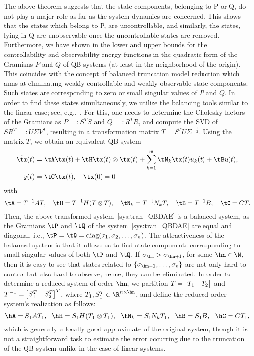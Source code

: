 The above theorem suggests that the state components, belonging to \ker P or \ker Q, do not play a major role as far as the system dynamics are concerned. This shows that the states which belong to \ker P,  are uncontrollable, and similarly, the states, lying in \ker Q are unobservable once the uncontrollable states are removed. Furthermore, we have shown in  the lower and upper bounds for the controllability and observability energy functions in the quadratic form of the Gramians $P$ and $Q$ of QB systems (at least in the neighborhood of the origin). This coincides with the concept of balanced truncation model reduction which aims at eliminating weakly controllable and weakly observable state components. Such states are corresponding to zero or small singular values of $P$ and $Q$. In order to find these states simultaneously, we utilize the balancing tools similar to the linear case; see, e.g.,~\cite{moral1994,morAnt05}. For this, one needs to determine the Cholesky factors of the Gramians as  $P =: S^TS$  and $Q =: R^TR$, and compute the SVD of $ SR^T =: U\Sigma V^T $, resulting in a transformation matrix $T = S^TU\Sigma^{-\tfrac{1}{2}}$. Using the matrix $T$, we obtain an equivalent QB system
\begin{equation}\label{sys:tran_QBDAE}
\begin{aligned}
\dot{\tx}(t) &= \tA \tx(t) + \tH \tx(t)\otimes \tx(t) + \sum_{k=1}^m\tN_k \tx(t)u_k(t) + \tB u(t),\\
y(t) &= \tC \tx(t),\quad \tx(0) = 0
\end{aligned}
\end{equation}
with $$\tA = T^{-1}AT,\quad\tH = T^{-1}H(T\otimes T),\quad\tN_k = T^{-1}N_kT,\quad\tB = T^{-1}B,\quad\tC = CT.$$
Then, the above transformed system~\eqref{sys:tran_QBDAE} is a balanced system, as the Gramians $\tP$ and $\tQ$ of the system~\eqref{sys:tran_QBDAE} are equal and diagonal, i.e., $\tP = \tQ = \mbox{diag}(\sigma_1,\sigma_2,\ldots,\sigma_n)$. The attractiveness of the balanced system is that it allows us to find  state components corresponding to small singular values of both $\tP$ and $\tQ$. If $\sigma_{\hn} > \sigma_{\hn+1}$, for some $\hn\in\N$, then it is easy to see that states related to $\{\sigma_{\hn+1},\ldots,\sigma_n\}$ are not only hard to control but also hard to observe; hence, they can be eliminated. In order to determine a reduced system of order $\hn$, we partition $T = \begin{bmatrix} T_1 &T_2\end{bmatrix}$ and $T^{-1} = \begin{bmatrix} S_1^T & S_2^T\end{bmatrix}^T$, where $T_1,S_1^T \in \R^{n\times \hn}$, and define the reduced-order system's realization as follows:
\begin{equation}\label{eq:red_realization}
\hA = S_1AT_1,~~\hH = S_1H(T_1\otimes T_1),~~\hN_k = S_1N_kT_1,~~\hB = S_1B,~~\hC = CT_1,
\end{equation}
which is generally a locally good approximate of the original system; though it is not a straightforward task to estimate the error occurring due to the truncation of the QB system unlike in the case of linear systems.   

